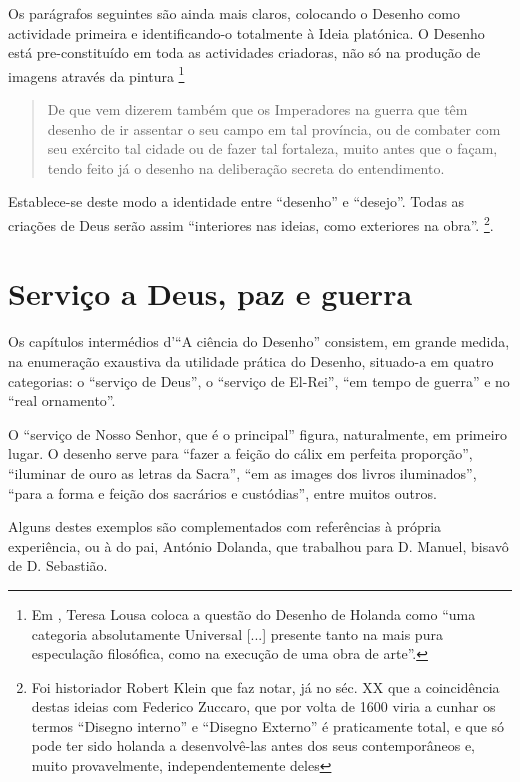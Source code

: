 \documentclass{article}
\begin{document}
Os parágrafos seguintes são ainda mais claros, colocando o Desenho
como actividade primeira e identificando-o totalmente à Ideia
platónica. O Desenho está pre-constituído em toda as actividades
criadoras, não só na produção de imagens através da
pintura\cite[fl.37v]{holanda} \footnote{Em \cite{teresa-desenho}, Teresa
  Lousa coloca a questão do Desenho de Holanda como ``uma categoria
  absolutamente Universal [...] presente tanto na mais pura
  especulação filosófica, como na execução de uma obra de arte''.}

\begin{quote}
  De que vem dizerem também que os Imperadores na guerra que têm
  desenho de ir assentar o seu campo em tal província, ou de combater
  com seu exército tal cidade ou de fazer tal fortaleza, muito antes
  que o façam, tendo feito já o desenho na deliberação secreta do
  entendimento.
\end{quote}

Establece-se deste modo a identidade entre ``desenho'' e
``desejo''. Todas as criações de Deus serão assim ``interiores nas
ideias, como exteriores na obra''\cite[fl.37v]{holanda}. \footnote{Foi
  historiador Robert Klein que faz notar, já no séc. XX que a
  coincidência destas ideias com Federico Zuccaro, que por volta de
  1600 viria a cunhar os termos ``Disegno interno'' e ``Disegno
  Externo'' é praticamente total, e que só pode ter sido holanda a
  desenvolvê-las antes dos seus contemporâneos e, muito provavelmente,
  independentemente deles}.

\section{Serviço a Deus, paz e guerra }

Os capítulos intermédios d'``A ciência do Desenho'' consistem, em
grande medida, na enumeração exaustiva da utilidade prática do
Desenho, situado-a em quatro categorias: o ``serviço de Deus'', o
``serviço de El-Rei'', ``em tempo de guerra'' e no ``real ornamento''.

O ``serviço de Nosso Senhor, que é o principal''\cite[fl.38r]{holanda}
figura, naturalmente, em primeiro lugar. O desenho serve para ``fazer
a feição do cálix em perfeita proporção'', ``iluminar de ouro as
letras da Sacra'', ``em as images dos livros iluminados'', ``para a
forma e feição dos sacrários e custódias'', entre muitos outros.

Alguns destes exemplos são complementados com referências à própria
experiência, ou à do pai, António Dolanda, que trabalhou para
D. Manuel, bisavô de D. Sebastião.
\end{document}
